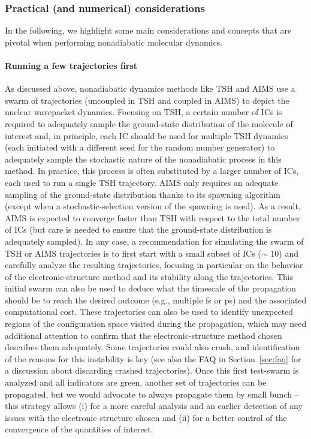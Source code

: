 \documentclass[9pt,bestpractices]{livecoms}
\begin{document}
\subsubsection{Practical (and numerical) considerations} \label{sec:practicalcons}
In the following, we highlight some main considerations and concepts that are pivotal when performing nonadiabatic molecular dynamics. 

\paragraph{Running a few trajectories first}
As discussed above, nonadiabatic dynamics methods like TSH and AIMS use a swarm of trajectories (uncoupled in TSH and coupled in AIMS) to depict the nuclear wavepacket dynamics. Focusing on TSH, a certain number of ICs is required to adequately sample the ground-state distribution of the molecule of interest and, in principle, each IC should be used for multiple TSH dynamics (each initiated with a different seed for the random number generator) to adequately sample the stochastic nature of the nonadiabatic process in this method.\cite{Granucci2007,ibele2020} In practice, this process is often substituted by a larger number of ICs, each used to run a single TSH trajectory. AIMS only requires an adequate sampling of the ground-state distribution thanks to its spawning algorithm (except when a stochastic-selection version of the spawning is used). As a result, AIMS is expected to converge faster than TSH with respect to the total number of ICs\cite{Toniolo2005,Mukherjeelongtime2025} (but care is needed to ensure that the ground-state distribution is adequately sampled\cite{10.1063/5.0248950}). In any case, a recommendation for simulating the swarm of TSH or AIMS trajectories is to first start with a small subset of ICs ($\sim$ 10) and carefully analyze the resulting trajectories, focusing in particular on the behavior of the electronic-structure method and its stability along the trajectories. This initial swarm can also be used to deduce what the timescale of the propagation should be to reach the desired outcome (e.g., multiple fs or ps) and the associated computational cost. These trajectories can also be used to identify unexpected regions of the configuration space visited during the propagation, which may need additional attention to confirm that the electronic-structure method chosen describes them adequately. Some trajectories could also crash, and identification of the reasons for this instability is key (see also the FAQ in Section~\ref{sec:faq} for a discussion about discarding crashed trajectories). Once this first test-swarm is analyzed and all indicators are green, another set of trajectories can be propagated, but we would advocate to always propagate them by small bunch -- this strategy allows (i) for a more careful analysis and an earlier detection of any issues with the electronic structure chosen and (ii) for a better control of the convergence of the quantities of interest.
\end{document}
